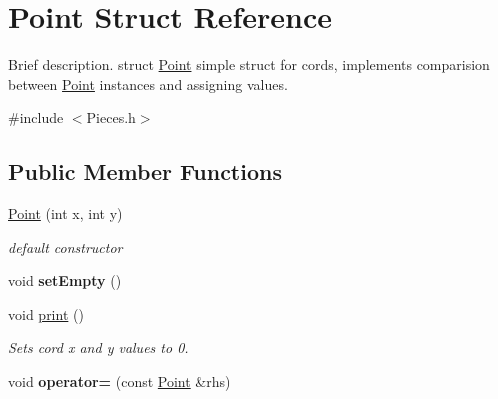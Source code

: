 \hypertarget{struct_point}{\section{Point Struct Reference}
\label{struct_point}
}


Brief description. struct \hyperlink{struct_point}{Point} simple struct for cords, implements comparision between \hyperlink{struct_point}{Point} instances and assigning values.  




{\ttfamily \#include $<$Pieces.\-h$>$}

\subsection*{Public Member Functions}
\begin{DoxyCompactItemize}
\item 
\hyperlink{struct_point_a001c4958c310b248f5c26037aea38a9c}{Point} (int x, int y)
\begin{DoxyCompactList}\small\item\em default constructor \end{DoxyCompactList}\item 
\hypertarget{struct_point_a26844fd8368a6c5d34713d8ac1185fbe}{void {\bfseries set\-Empty} ()}\label{struct_point_a26844fd8368a6c5d34713d8ac1185fbe}

\item 
\hypertarget{struct_point_a76c5855c06d98aed16b5796a9a50bbee}{void \hyperlink{struct_point_a76c5855c06d98aed16b5796a9a50bbee}{print} ()}\label{struct_point_a76c5855c06d98aed16b5796a9a50bbee}

\begin{DoxyCompactList}\small\item\em Sets cord x and y values to 0. \end{DoxyCompactList}\item 
\hypertarget{struct_point_a5bb149491b3759746415a8ed97d63d25}{void {\bfseries operator=} (const \hyperlink{struct_point}{Point} \&rhs)}\label{struct_point_a5bb149491b3759746415a8ed97d63d25}

\end{DoxyCompactItemize}
